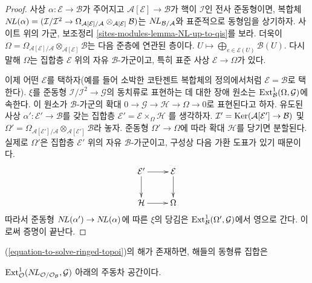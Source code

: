 \begin{proof}
사상 $\alpha : \mathcal{E} \to \mathcal{B}$가 주어지고
$\mathcal{A}[\mathcal{E}] \to \mathcal{B}$가 핵이 $\mathcal{I}$인
전사 준동형이면, 복합체
$\mathop{N\!L}\nolimits(\alpha) = (\mathcal{I}/\mathcal{I}^2 \to 
\Omega_{\mathcal{A}[\mathcal{E}]/\mathcal{A}}
\otimes_{\mathcal{A}[\mathcal{E}]} \mathcal{B})$는
$\mathop{N\!L}\nolimits_{\mathcal{B}/\mathcal{A}}$와 표준적으로 동형임을 상기하자.
사이트 위의 가군, 보조정리 \ref{sites-modules-lemma-NL-up-to-qis}를
보라. 더욱이
$\Omega = \Omega_{\mathcal{A}[\mathcal{E}]/\mathcal{A}}
\otimes_{\mathcal{A}[\mathcal{E}]} \mathcal{B}$는 다음 준층에 연관된
층이다.
$U \mapsto \bigoplus_{e \in \mathcal{E}(U)} \mathcal{B}(U)$.
다시 말해 $\Omega$는 집합층 $\mathcal{E}$ 위의 자유
$\mathcal{B}$-가군이고, 특히 표준 사상 $\mathcal{E} \to \Omega$가 있다.

\medskip\noindent
이제 어떤 $\mathcal{E}$를 택하자(예를 들어 소박한 코탄젠트 복합체의
정의에서처럼 $\mathcal{E} = \mathcal{B}$로 택한다). $\xi$를 준동형
$\mathcal{I}/\mathcal{I}^2 \to \mathcal{G}$의 동치류로 표현하는 데 대한
장애 원소는 $\mathop{\mathrm{Ext}}\nolimits^1_\mathcal{B}(\Omega, \mathcal{G})$에 속한다.
이 원소가 $\mathcal{B}$-가군의 확대
$0 \to \mathcal{G} \to \mathcal{H} \to \Omega \to 0$로 표현된다고
하자. 유도된 사상 $\alpha' : \mathcal{E}' \to \mathcal{B}$를 갖는
집합층
$\mathcal{E}' = \mathcal{E} \times_\Omega \mathcal{H}$
를 생각하자. $\mathcal{I}' =
\mathop{\mathrm{Ker}}(\mathcal{A}[\mathcal{E}'] \to \mathcal{B})$ 및
$\Omega' = \Omega_{\mathcal{A}[\mathcal{E}']/\mathcal{A}}
\otimes_{\mathcal{A}[\mathcal{E}']} \mathcal{B}$라 놓자.
준동형 $\Omega' \to \Omega$에 따라 확대 $\mathcal{H}$를 당기면
분할된다. 실제로 $\Omega'$은 집합층 $\mathcal{E}'$ 위의 자유
$\mathcal{B}$-가군이고, 구성상 다음 가환 도표가 있기 때문이다.
$$
\xymatrix{
\mathcal{E}' \ar[r] \ar[d] & \mathcal{E} \ar[d] \\
\mathcal{H} \ar[r] & \Omega
}
$$
따라서 준동형 $\mathop{N\!L}\nolimits(\alpha') \to \mathop{N\!L}\nolimits(\alpha)$에 따른 $\xi$의 당김은
$\mathop{\mathrm{Ext}}\nolimits^1_\mathcal{B}(\Omega', \mathcal{G})$에서 영으로 간다. 이로써
증명이 끝난다.
\end{proof}

\begin{lemma}
\label{lemma-choices-ringed-topoi}
(\ref{equation-to-solve-ringed-topoi})의 해가 존재하면, 해들의 동형류
집합은\par\noindent
$\mathop{\mathrm{Ext}}\nolimits^1_\mathcal{O}(
\mathop{N\!L}\nolimits_{\mathcal{O}/\mathcal{O}_\mathcal{B}}, \mathcal{G})$ 아래의 주동차
공간이다.
\end{lemma}

